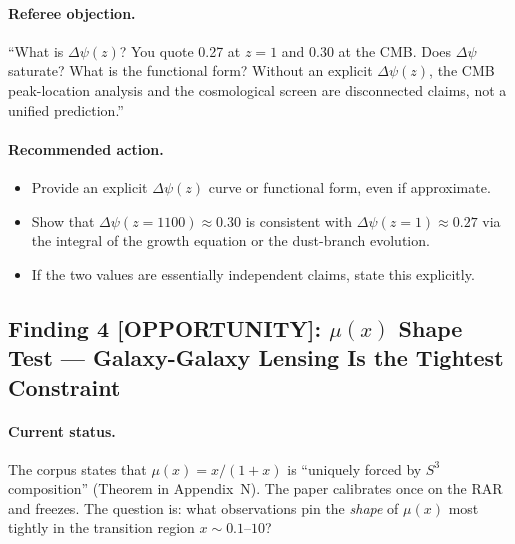 \paragraph{Referee objection.}
``What is $\Delta\psi(z)$?  You quote 0.27 at $z = 1$ and 0.30 at the
CMB.  Does $\Delta\psi$ saturate?  What is the functional form?  Without
an explicit $\Delta\psi(z)$, the CMB peak-location analysis and the
cosmological screen are disconnected claims, not a unified prediction.''

\paragraph{Recommended action.}
\begin{itemize}
\item Provide an explicit $\Delta\psi(z)$ curve or functional form,
  even if approximate.
\item Show that $\Delta\psi(z=1100) \approx 0.30$ is consistent with
  $\Delta\psi(z=1) \approx 0.27$ via the integral of the growth
  equation or the dust-branch evolution.
\item If the two values are essentially independent claims, state
  this explicitly.
\end{itemize}

\subsection*{Finding 4 [OPPORTUNITY]:
$\mu(x)$ Shape Test --- Galaxy-Galaxy Lensing Is the Tightest Constraint}

\paragraph{Current status.}
The corpus states that $\mu(x) = x/(1+x)$ is ``uniquely forced by
$S^3$ composition'' (Theorem in Appendix~N).  The paper calibrates
once on the RAR and freezes.  The question is: what observations pin
the \emph{shape} of $\mu(x)$ most tightly in the transition region
$x \sim 0.1$--$10$?

